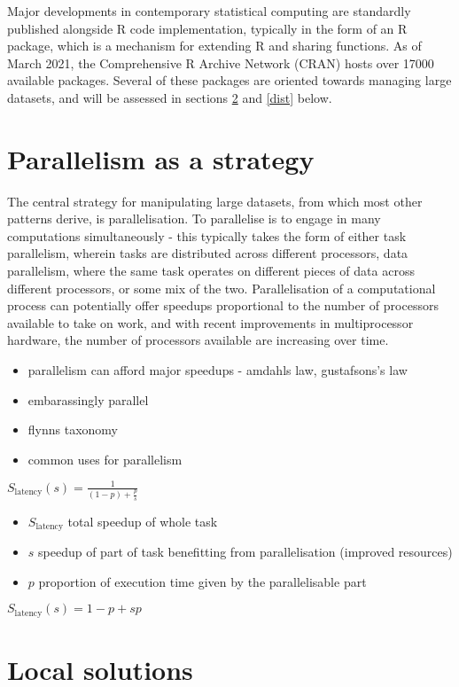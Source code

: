 \documentclass[a4paper,10pt]{article}
\begin{document}
Major developments in contemporary statistical computing are standardly published alongside R code implementation, typically in the form of an R package, which is a mechanism for extending R and sharing functions.
As of March 2021, the Comprehensive R Archive Network (CRAN) hosts over 17000 available packages\cite{team20:_r}.
Several of these packages are oriented towards managing large datasets, and will be assessed in sections \ref{local} and \ref{dist}  below.

\section{Parallelism as a strategy}
\label{parallel}
The central strategy for manipulating large datasets, from which most other patterns derive, is parallelisation. To parallelise is to engage in many computations simultaneously - this typically takes the form of either task parallelism, wherein tasks are distributed across different processors, data parallelism, where the same task operates on different pieces of data across different processors, or some mix of the two.
Parallelisation of a computational process can potentially offer speedups proportional to the number of processors available to take on work, and with recent improvements in multiprocessor hardware, the number of processors available are increasing over time.
\begin{itemize}
	\item parallelism can afford major speedups - amdahls law, gustafsons's law
	\item embarassingly parallel
	\item flynns taxonomy
	\item common uses for parallelism
\end{itemize}
\cite{amdahl1967law}
$S_\textrm{latency}(s) = \frac{1}{(1-p)+\frac{p}{s}}$
\begin{itemize}
	\item \(S_\textrm{latency}\) total speedup of whole task
	\item \(s\) speedup of part of task benefitting from parallelisation (improved resources)
	\item \(p\) proportion of execution time given by the parallelisable part
\end{itemize}
\cite{gustafson1988law}
$S_\textrm{latency}(s) = 1 - p + sp $
\cite{flynn1972org}

\section{Local solutions}
\label{local}
\end{document}
